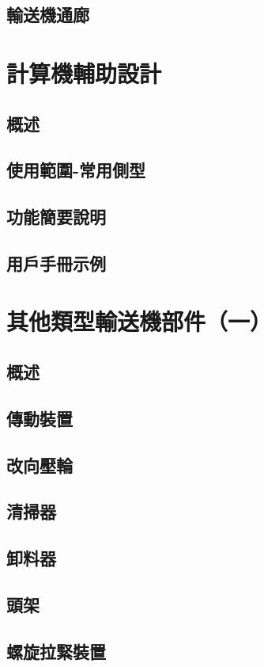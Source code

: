 \documentclass[UTF8]{ctexart}
\begin{document}
\subsection{輸送機通廊}




\newpage
\section{計算機輔助設計}
\subsection{概述}
\subsection{使用範圍-常用側型}
\subsection{功能簡要說明}
\subsection{用戶手冊示例}

\newpage
\section{其他類型輸送機部件（一）}
\subsection{概述}
\subsection{傳動裝置}
\subsection{改向壓輪}
\subsection{清掃器}
\subsection{卸料器}
\subsection{頭架}
\subsection{螺旋拉緊裝置}
\end{document}
